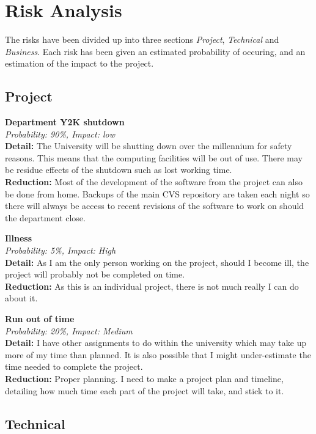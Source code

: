 
\newcommand{\risk}[3]{{\large \textbf{#1}} \\ \emph{Probability: #2\%, Impact: #3}\\}

\chapter{Risk Analysis}
The risks have been divided up into three sections \emph{Project},
\emph{Technical} and \emph{Business}.  Each risk has been given an estimated probability of occuring, and an estimation of the impact to the project.

\section{Project}
\risk{Department Y2K shutdown}{90}{low}
\textbf{Detail:} The University will be shutting down over the millennium
for safety
reasons. This means that the computing facilities will be out of use.
There may be residue effects of the shutdown such as lost working time.
\\
\textbf{Reduction:} Most of the development of the software from the project can also be done from home.  Backups of the main CVS repository are taken each night so there will always be access to recent revisions of the software to work on should the department close.
\vspace{3mm}

\risk{Illness}{5}{High}
\textbf{Detail:} As I am the only person working on the project, should I become ill, the project will probably not be completed on time. 
\\
\textbf{Reduction:} As this is an individual project, there is not much really I can do about it.  
\vspace{3mm}

\risk{Run out of time}{20}{Medium}
\textbf{Detail:} I have other assignments to do within the university which may take up more of my time than planned. It is also possible that I might under-estimate the time needed to complete the project.
\\
\textbf{Reduction:} Proper planning.  I need to make a project plan and timeline, detailing how much time each part of the project will take, and stick to it.

\section{Technical}

